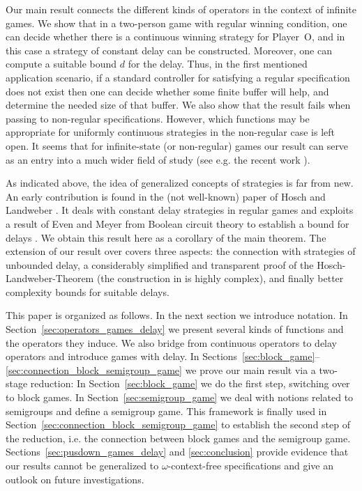 \documentclass[fleqn,envcountsame]{LMCS}
\newcommand{\pO}{Player~O\xspace}
\newcommand{\ie}{i.e.\xspace}
\newcommand{\eg}{e.g.\xspace}
\begin{document}
Our main result connects the different kinds of operators
in the context of infinite games. We show that
in a two-person game with regular winning condition, one can decide whether
there is a continuous winning strategy for \pO, and in this case 
a strategy of constant delay can be constructed.
Moreover, one can compute a suitable bound $d$ for the delay.
Thus, in the first mentioned application scenario, if a standard
controller for satisfying a regular specification does not exist then
one can decide whether some finite buffer will help, and determine
the needed size of that buffer. We also show that the result fails when
passing to non-regular specifications. However, which functions may be
appropriate for uniformly continuous strategies in the non-regular
case is left open. It seems that for infinite-state (or non-regular)
games our result can serve as an entry into a much wider field of study
(see \eg the recent work \cite{FLZ11}).

As indicated above, the idea of generalized concepts of strategies is
far from new. An early contribution is found in the (not well-known)
paper of Hosch and Landweber \cite{HL72FinDelSol}. It deals with constant
delay strategies in regular games and exploits a result of Even and Meyer
from Boolean circuit theory
to establish a bound for delays \cite{EM69SeqBoolEq}.
We obtain this result here as a corollary of the main theorem.
The extension of our result over \cite{HL72FinDelSol} covers
three aspects: the connection with strategies of unbounded delay,
a considerably simplified and transparent proof of the Hosch-Landweber-Theorem
(the construction in \cite{HL72FinDelSol} is highly complex),
and finally better complexity bounds for suitable delays.

This paper is organized as follows.
In the next section we introduce notation.
In Section~\ref{sec:operators_games_delay} we present several kinds
of functions and the operators they induce.
We also bridge from continuous operators to delay operators
and introduce games with delay.
In Sections~\ref{sec:block_game}--\ref{sec:connection_block_semigroup_game}
we prove our main result via a two-stage reduction:
In Section~\ref{sec:block_game} we do the first step,
switching over to block games.
In Section~\ref{sec:semigroup_game} we deal with notions
related to semigroups
and define a semigroup game.
This framework is finally used in Section~\ref{sec:connection_block_semigroup_game}
to establish the second step of the reduction, \ie the connection between
block games and the semigroup game.
Sections~\ref{sec:pusdown_games_delay} and \ref{sec:conclusion}
provide evidence that our results cannot be generalized
to $\omega$-context-free specifications and give an outlook
on future investigations.
\end{document}
